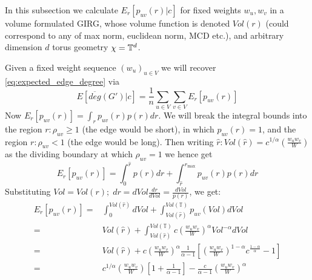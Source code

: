 In this subsection we calculate $E_r[p_{uv}(r) | c]$ for fixed weights $w_u, w_v$ in a volume formulated GIRG, whose volume function is denoted $Vol(r)$ (could correspond to any of max norm, euclidean norm, MCD etc.), and arbitrary dimension $d$ torus geometry $\chi = \mathbb{T}^d$.

Given a fixed weight sequence $(w_u)_{u \in V}$ we will recover \cref{eq:expected_edge_degree} via 
\begin{equation}
    E[\overline{deg}(G') | c] = \frac{1}{n} \sum_{u \in V} \sum_{v \in V} E_r[p_{uv}(r)]
\end{equation}
Now $E_r[p_{uv}(r)] = \int_r p_{uv}(r) p(r) dr$. We will break the integral bounds into the region $r: \rho_{uv} \geq 1$ (the edge would be short), in which $p_{uv}(r)=1$, and the region $r: \rho_{uv} < 1$ (the edge would be long). Then writing $\hat{r} : Vol(\hat{r}) = c^{1/\alpha} \left ( \frac{w_u w_v}{W} \right )$ as the dividing boundary at which $\rho_{uv} = 1$ we hence get
\begin{equation}
    E_r[p_{uv}(r)] = \int_0^{\hat{r}} p(r) dr + \int_{\hat{r}}^{r_{\max}} p_{uv}(r) p(r) dr
\end{equation}
Substituting $Vol = Vol(r);\; dr = dVol \frac{dr}{dVol} = \frac{dVol}{p(r)}$, we get:
\begin{align}
    \label{eq:p_u_to_v_marginal_on_position}
    E_r[p_{uv}(r)] =& 
    \int_0^{Vol(\hat{r})} dVol + 
    \int_{Vol(\hat{r})}^{Vol(\mathbb{T})} p_{uv}(Vol) dVol
    \\
    =&
    Vol(\hat{r}) + 
    \int_{Vol(\hat{r})}^{Vol(\mathbb{T})} 
    c \left (\frac{w_u w_v}{W} \right )^\alpha Vol^{-\alpha}  
        dVol
    \\
    =&
    Vol(\hat{r}) + 
    c \left (\frac{w_u w_v}{W} \right )^\alpha \frac{1}{\alpha - 1}
        \left [
            \left (\frac{w_u w_v}{W} \right )^{1 - \alpha} c^{\frac{1 - \alpha}{\alpha}} - 1
        \right ]
    \\
    =&
    c^{1/\alpha} \left (\frac{w_u w_v}{W} \right ) 
        \left [ 1 + \frac{1}{\alpha - 1} \right ] 
    - 
    \frac{c}{\alpha - 1} \left (\frac{w_u w_v}{W} \right )^\alpha
\end{align}
